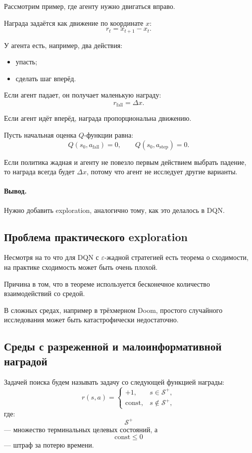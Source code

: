\documentclass[12pt,a4paper]{article}
\begin{document}
Рассмотрим пример, где агенту нужно двигаться вправо.

Награда задаётся как движение по координате $x$:
\[
r_t
=
x_{t+1}-x_t.
\]

У агента есть, например, два действия:
\begin{itemize}
    \item упасть;
    \item сделать шаг вперёд.
\end{itemize}

Если агент падает, он получает маленькую награду:
\[
r_{\mathrm{fall}} = \Delta x.
\]

Если агент идёт вперёд, награда пропорциональна движению.

Пусть начальная оценка $Q$-функции равна:
\[
Q(s_0,a_{\mathrm{fall}})=0,
\qquad
Q(s_0,a_{\mathrm{step}})=0.
\]

Если политика жадная и агенту не повезло первым действием выбрать падение, то награда всегда будет $\Delta x$, потому что агент не исследует другие варианты.

\paragraph{Вывод.}

Нужно добавить exploration, аналогично тому, как это делалось в DQN.

\subsection{Проблема практического exploration}

Несмотря на то что для DQN с $\varepsilon$-жадной стратегией есть теорема о сходимости, на практике сходимость может быть очень плохой.

Причина в том, что в теореме используется бесконечное количество взаимодействий со средой.

В сложных средах, например в трёхмерном Doom, простого случайного исследования может быть катастрофически недостаточно.

\subsection{Среды с разреженной и малоинформативной наградой}

Задачей поиска будем называть задачу со следующей функцией награды:
\[
r(s,a)
=
\begin{cases}
+1, & s \in \mathcal S^+,\\
\mathrm{const}, & s \notin \mathcal S^+,
\end{cases}
\]
где:
\[
\mathcal S^+
\]
--- множество терминальных целевых состояний, а
\[
\mathrm{const} \le 0
\]
--- штраф за потерю времени.
\end{document}

